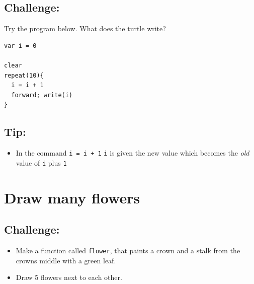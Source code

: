 \section*{\color{BrickRed}Challenge:}
Try the program below. What does the turtle write?

\begin{lstlisting}[basicstyle={\ttfamily\fontsize{16}{19}\selectfont},numbers=none]
var i = 0

clear
repeat(10){
  i = i + 1
  forward; write(i)
}
\end{lstlisting}
        
\section*{\color{OliveGreen}Tip:}


\begin{itemize}

\item {In the command \lstinline{i = i + 1} \lstinline{i} is given the new value which becomes the {\it old} value of \lstinline{i} plus \lstinline{1}}

\end{itemize}


\chapter{Draw many flowers}\section*{\color{BrickRed}Challenge:}


\begin{itemize}

\item {Make a function called \lstinline{flower}, that paints a crown and a stalk from the crowns middle with a green leaf.}
\item {Draw 5 flowers next to each other.}

\end{itemize}



  
